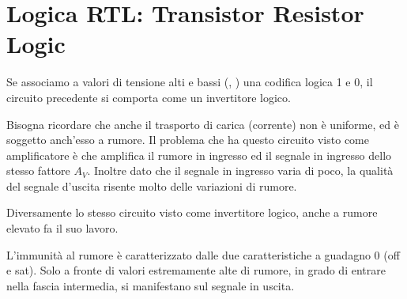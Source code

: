 \documentclass[../template]{subfiles}
\begin{document}
\section{Logica RTL: Transistor Resistor Logic}
Se associamo a valori di tensione alti e bassi (, ) una codifica logica 1 e 0, il circuito precedente si comporta come un invertitore
logico.

Bisogna ricordare che anche il trasporto di carica (corrente) non è uniforme, ed è soggetto anch'esso a rumore.
Il problema che ha questo circuito visto come amplificatore è che amplifica il rumore in ingresso ed il segnale in ingresso dello stesso
fattore $A_V$.
Inoltre dato che il segnale in ingresso varia di poco, la qualità del segnale d'uscita risente molto delle variazioni di rumore.

Diversamente lo stesso circuito visto come invertitore logico, anche a rumore elevato fa il suo lavoro.

L'immunità al rumore è caratterizzato dalle due caratteristiche a guadagno 0 (off e sat). Solo a fronte di valori estremamente alte di rumore, in
grado di entrare nella fascia intermedia, si manifestano sul segnale in uscita.
\end{document}
